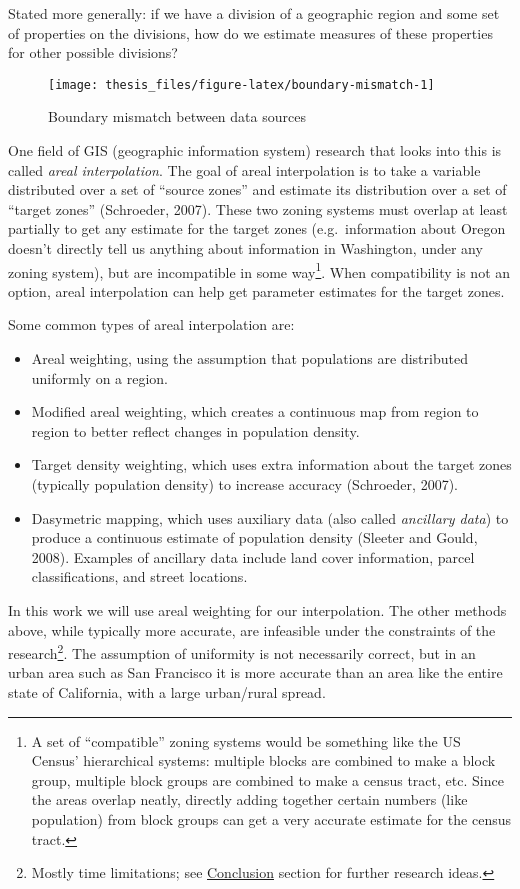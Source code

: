 \documentclass[12pt,twoside]{reedthesis}
\begin{document}
Stated more generally: if we have a division of a geographic region and some set of properties on the divisions, how do we estimate measures of these properties for other possible divisions?
\begin{figure}
\texttt{[image: thesis\_files/figure-latex/boundary-mismatch-1]} \caption{Boundary mismatch between data sources}\label{fig:boundary-mismatch}
\end{figure}
One field of GIS (geographic information system) research that looks into this is called \emph{areal interpolation}. The goal of areal interpolation is to take a variable distributed over a set of ``source zones'' and estimate its distribution over a set of ``target zones'' (Schroeder, 2007). These two zoning systems must overlap at least partially to get any estimate for the target zones (e.g.~information about Oregon doesn't directly tell us anything about information in Washington, under any zoning system), but are incompatible in some way\footnote{A set of ``compatible'' zoning systems would be something like the US Census' hierarchical systems: multiple blocks are combined to make a block group, multiple block groups are combined to make a census tract, etc. Since the areas overlap neatly, directly adding together certain numbers (like population) from block groups can get a very accurate estimate for the census tract.}. When compatibility is not an option, areal interpolation can help get parameter estimates for the target zones.

Some common types of areal interpolation are:
\begin{itemize}
\item
  Areal weighting, using the assumption that populations are distributed uniformly on a region.
\item
  Modified areal weighting, which creates a continuous map from region to region to better reflect changes in population density.
\item
  Target density weighting, which uses extra information about the target zones (typically population density) to increase accuracy (Schroeder, 2007).
\item
  Dasymetric mapping, which uses auxiliary data (also called \emph{ancillary data}) to produce a continuous estimate of population density (Sleeter and Gould, 2008). Examples of ancillary data include land cover information, parcel classifications, and street locations.
\end{itemize}
In this work we will use areal weighting for our interpolation. The other methods above, while typically more accurate, are infeasible under the constraints of the research\footnote{Mostly time limitations; see \protect\hyperlink{further-research}{Conclusion} section for further research ideas.}. The assumption of uniformity is not necessarily correct, but in an urban area such as San Francisco it is more accurate than an area like the entire state of California, with a large urban/rural spread.
\end{document}
